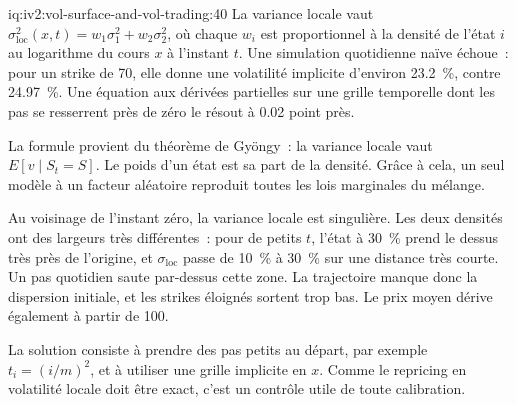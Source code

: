 \begin{solution}{iq:iv2:vol-surface-and-vol-trading:40}
La variance locale vaut $\sigma^2_{\text{loc}}(x, t) = w_1\sigma_1^2 + w_2\sigma_2^2$, où chaque $w_i$ est proportionnel à la densité de l'état $i$ au logarithme du cours $x$ à l'instant $t$. Une simulation quotidienne naïve échoue~: pour un strike de 70, elle donne une volatilité implicite d'environ 23.2~\%, contre 24.97~\%. Une équation aux dérivées partielles sur une grille temporelle dont les pas se resserrent près de zéro le résout à 0.02 point près.

La formule provient du théorème de Gyöngy~: la variance locale vaut $E[v \mid S_t = S]$. Le poids d'un état est sa part de la densité. Grâce à cela, un seul modèle à un facteur aléatoire reproduit toutes les lois marginales du mélange.

Au voisinage de l'instant zéro, la variance locale est singulière. Les deux densités ont des largeurs très différentes~: pour de petits $t$, l'état à 30~\% prend le dessus très près de l'origine, et $\sigma_{\text{loc}}$ passe de 10~\% à 30~\% sur une distance très courte. Un pas quotidien saute par-dessus cette zone. La trajectoire manque donc la dispersion initiale, et les strikes éloignés sortent trop bas. Le prix moyen dérive également à partir de 100.

La solution consiste à prendre des pas petits au départ, par exemple $t_i = (i/m)^2$, et à utiliser une grille implicite en $x$. Comme le repricing en volatilité locale doit être exact, c'est un contrôle utile de toute calibration.

\end{solution}
